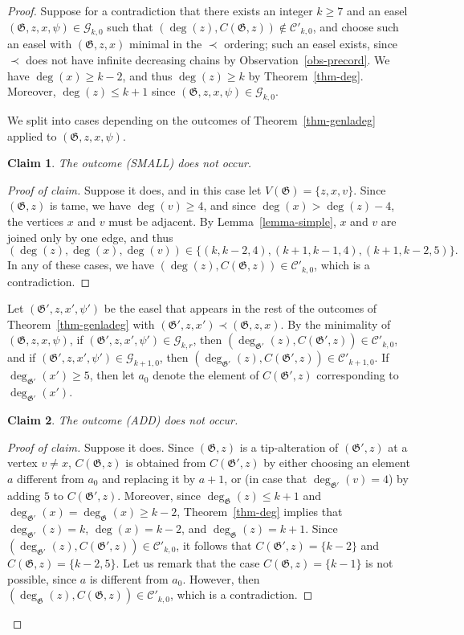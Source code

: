 \documentclass{article}
\newcommand{\GG}{\mathcal{G}}
\newcommand{\CC}{\mathcal{C}}
\newcommand\g{\mathfrak{G}}
\newtheorem*{claim*}{Claim}
\newenvironment{subproof}{%
  \renewcommand{\qedsymbol}{$\blacksquare$}%
  \begin{proof}[Proof of claim]%
}{%
  \end{proof}%
}
\begin{document}
\begin{proof}
Suppose for a contradiction that there exists an integer $k\ge 7$ and an easel $(\g,z,x,\psi)\in \GG_{k,0}$ such that
$(\deg(z), C(\g,z))\not\in \CC'_{k,0}$, and choose such an easel with $(\g,z,x)$ minimal in the $\prec$ ordering;
such an easel exists, since $\prec$ does not have infinite decreasing chains by Observation~\ref{obs-precord}.
We have $\deg(x) \ge k-2$, and thus $\deg(z)\ge k$ by Theorem~\ref{thm-deg}.  Moreover, $\deg(z)\le k+1$
since $(\g,z,x,\psi)\in \GG_{k,0}$.

We split into cases depending on the outcomes of Theorem~\ref{thm-genladeg} applied to $(\g,z,x,\psi)$. 
\begin{claim*}
The outcome (SMALL) does not occur.
\end{claim*}
\begin{subproof}
Suppose it does, and in this case let $V(\g)=\{z,x,v\}$.  Since $(\g,z)$ is tame, we have $\deg(v) \ge 4$, and since $\deg(x)>\deg(z)-4$,
the vertices $x$ and $v$ must be adjacent.  By Lemma~\ref{lemma-simple}, $x$ and $v$ are joined only by one edge, and thus
$$(\deg(z),\deg(x),\deg(v))\in \{(k,k-2,4),(k+1,k-1,4),(k+1,k-2,5)\}.$$  In any of these cases, we have $(\deg(z),C(\g,z))\in \CC'_{k,0}$,
which is a contradiction.
\end{subproof}

Let $(\g',z,x',\psi')$ be the easel that appears in the rest of the outcomes of Theorem~\ref{thm-genladeg} with $(\g',z,x')\prec (\g,z,x)$.
By the minimality of $(\g,z,x,\psi)$, if $(\g',z,x',\psi')\in \GG_{k,r}$, then $(\deg_{\g'}(z),C(\g',z))\in \CC'_{k,0}$,
and if $(\g',z,x',\psi')\in \GG_{k+1,0}$, then $(\deg_{\g'}(z), C(\g',z))\in \CC'_{k+1,0}$.  If $\deg_{\g'}(x')\ge 5$, then let $a_0$ denote the element of
$C(\g',z)$ corresponding to $\deg_{\g'}(x')$.

\begin{claim*}
The outcome (ADD) does not occur.
\end{claim*}

\begin{subproof}
Suppose it does. Since $(\g,z)$ is a tip-alteration of $(\g',z)$ at a vertex $v\neq x$, $C(\g,z)$ is obtained from $C(\g',z)$
by either choosing an element $a$ different from $a_0$ and replacing it by $a+1$, or (in case that $\deg_{\g'}(v)=4$)
by adding $5$ to $C(\g',z)$.  Moreover, since $\deg_{\g}(z)\le k+1$ and $\deg_{\g'}(x)=\deg_{\g}(x)\ge k-2$,
Theorem~\ref{thm-deg} implies that $\deg_{\g'}(z)=k$, $\deg(x)=k-2$, and $\deg_{\g}(z)=k+1$.
Since $(\deg_{\g'}(z), C(\g',z))\in \CC'_{k,0}$, it follows that $C(\g',z)=\{k-2\}$ and $C(\g,z)=\{k-2,5\}$.
Let us remark that the case $C(\g,z)=\{k-1\}$ is not possible, since $a$ is different from $a_0$.
However, then $(\deg_{\g}(z),C(\g,z))\in \CC'_{k,0}$, which is a contradiction.
\end{subproof}


\end{proof}
\end{document}

